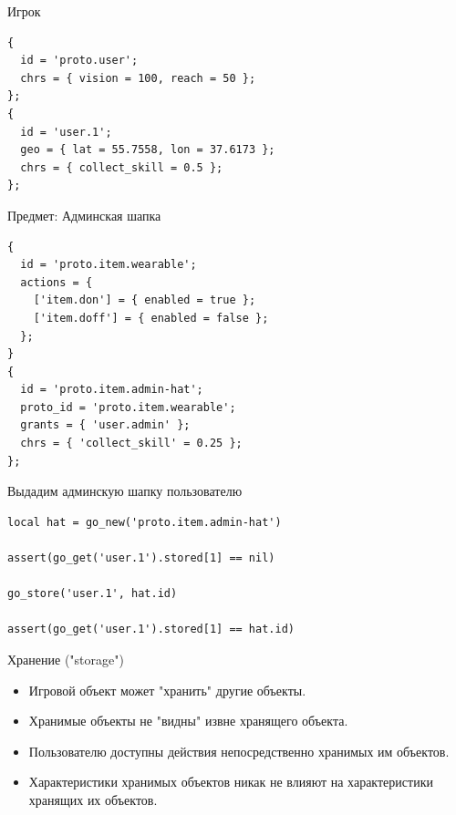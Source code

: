 \documentclass[aspectratio=169,handout,bigger]{beamer}
\begin{document}

\begin{frame}[fragile]{Игрок}
\begin{verbatim}
{
  id = 'proto.user';
  chrs = { vision = 100, reach = 50 };
};
{
  id = 'user.1';
  geo = { lat = 55.7558, lon = 37.6173 };
  chrs = { collect_skill = 0.5 };
};
\end{verbatim}
\end{frame}


\begin{frame}[fragile]{Предмет: Админская шапка}
\begin{verbatim}
{
  id = 'proto.item.wearable';
  actions = {
    ['item.don'] = { enabled = true };
    ['item.doff'] = { enabled = false };
  };
}
{
  id = 'proto.item.admin-hat';
  proto_id = 'proto.item.wearable';
  grants = { 'user.admin' };
  chrs = { 'collect_skill' = 0.25 };
};
\end{verbatim}
\end{frame}


\begin{frame}[fragile]{Выдадим админскую шапку пользователю}
\begin{verbatim}
local hat = go_new('proto.item.admin-hat')

assert(go_get('user.1').stored[1] == nil)

go_store('user.1', hat.id)

assert(go_get('user.1').stored[1] == hat.id)
\end{verbatim}
\end{frame}


\begin{frame}{Хранение ("storage")}
  \begin{itemize}
    \item Игровой объект может "хранить" другие объекты.
    \item Хранимые объекты не "видны" извне хранящего объекта.
    \item Пользователю доступны действия
          непосредственно хранимых им объектов.
    \item Характеристики хранимых объектов никак не влияют
          на характеристики хранящих их объектов.
  \end{itemize}
\end{frame}
\end{document}

